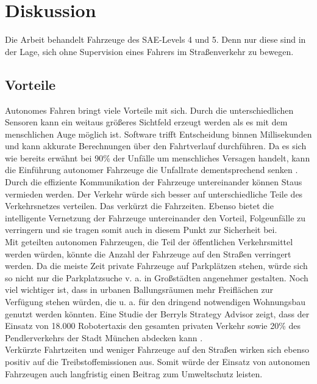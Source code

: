 \section{Diskussion}
\label{sec:diskussion}

Die Arbeit behandelt Fahrzeuge des SAE-Levels 4 und 5. Denn nur diese sind in der Lage, sich ohne Supervision eines Fahrers im Straßenverkehr zu bewegen. 

\subsection{Vorteile}

Autonomes Fahren bringt viele Vorteile mit sich. Durch die unterschiedlichen Sensoren kann ein weitaus größeres Sichtfeld erzeugt werden als es mit dem menschlichen Auge möglich ist. Software trifft Entscheidung binnen Millisekunden und kann akkurate Berechnungen über den Fahrtverlauf durchführen. 
Da es sich wie bereits erwähnt bei 90\% der Unfälle um menschliches Versagen handelt, kann die Einführung autonomer Fahrzeuge die Unfallrate dementsprechend senken \cite{roadSafty}.\\

Durch die effiziente Kommunikation der Fahrzeuge untereinander können Staus vermieden werden. Der Verkehr würde sich besser auf unterschiedliche Teile des Verkehrsnetzes verteilen. Das verkürzt die Fahrzeiten. Ebenso bietet die intelligente Vernetzung der Fahrzeuge untereinander den Vorteil, Folgeunfälle zu verringern und sie tragen somit auch in diesem Punkt zur Sicherheit bei.\\

Mit geteilten autonomen Fahrzeugen, die Teil der öffentlichen Verkehrsmittel werden würden, könnte die Anzahl der Fahrzeuge auf den Straßen verringert werden. Da die meiste Zeit private Fahrzeuge auf Parkplätzen stehen, würde sich so nicht nur die Parkplatzsuche v. a. in Großstädten angenehmer gestalten. Noch viel wichtiger ist, dass in urbanen Ballungsräumen mehr Freiflächen zur Verfügung stehen würden, die u. a. für den dringend notwendigen Wohnungsbau genutzt werden könnten. Eine Studie der Berryls Strategy Advisor zeigt, dass der Einsatz von 18.000 Robotertaxis den gesamten privaten Verkehr sowie 20\% des Pendlerverkehrs der Stadt München abdecken kann \cite{advisors2017simulation}.\\

Verkürzte Fahrtzeiten und weniger Fahrzeuge auf den Straßen wirken sich ebenso positiv auf die Treibstoffemissionen aus. Somit würde der Einsatz von autonomen Fahrzeugen auch langfristig einen Beitrag zum Umweltschutz leisten.\\

